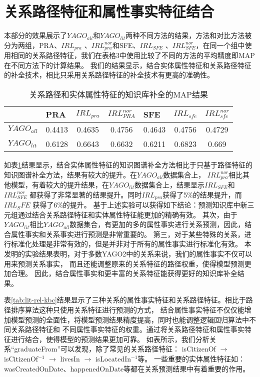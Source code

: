 \section{关系路径特征和属性事实特征结合}
\label{cha:exp-literal}
本部分的效果展示了$YAGO_{all}$和$YAGO_{lit}$两种不同方法的结果，方法和对比方法被分为两组，PRA、$IRL_{pra}$ 、$IRL_{pra}^{nor}$和SFE、$IRL_{SFE}$ 、$IRL_{SFE}^{nor}$，在同一个组中使用相同的关系路径特征，我们在表格3中使用比较了不同的方法的平均精度即MAP在不同方法下的计算结果。
我们的结果显示，结合实体属性特征和关系路径特征的补全技术，相比只采用关系路径特征的补全技术有更高的准确性。


\begin{table}[htbp]
  \centering
  \caption{关系路径和实体属性特征的知识库补全的MAP结果}
    \begin{tabular}{|l|c|c|c|c|c|c|}
    \hline
    \multicolumn{1}{|c|}{} & \multicolumn{1}{l|}{PRA} & \multicolumn{1}{l|}{$IRL_{pra}$} & \multicolumn{1}{l|}{$IRL_{PRA}^{nor}$} & \multicolumn{1}{l|}{SFE} & \multicolumn{1}{l|}{$IRL_{sfe}$} & \multicolumn{1}{l|}{$IRL_{sfe}^{nor}$} \\
    \hline
    $YAGO_{all}$ & 0.4413 & 0.4635 & 0.4756 & 0.4643 & 0.4756 & 0.4729 \\
    \hline
    $YAGO_{lit}$ & 0.6128 & 0.6643 & 0.6632 & 0.6211 & 0.6823 & 0.669 \\
    \hline
    \end{tabular}%
  \label{tab:addlabel}%
\end{table}%


如表\ref{tab:addlabel}结果显示，结合实体属性特征的知识图谱补全方法相比于只基于路径特征的知识图谱补全方法，结果有较大的提升。在$YAGO_{all}$数据集合上，
$IRL_{pra}^{nor}$相比其他模型，有着较大的提升结果，在$YAGO_{lit}$数据集合上，结果显示$IRL_{SFE}$和$IRL_{SFE}^{nor}$ 都获得了非常显著的结果提升。同时$IRL_{pra}$获得了5\%的结果提升，而$IRL_SFE$ 获得了6\%的提升。
基于上述实验可以获得如下结论：预测知识库中新三元组通过结合关系路径特征和实体属性特征能更加的精确有效。
其次，由于$YAGO_{lit}$相比$YAGO_{all}$数据集合，有更加的多的属性事实进行关系预测，因此，结合属性事实和关系事实进行预测是非常重要的。
第三，对于某些特殊的关系，进行标准化处理是非常有效的，但是并非对于所有的属性事实进行标准化有效。
本发明的实验结果表明，对于多数YAGO2中的关系来说，我们的属性事实不仅可以用来预测关系事实，
而且还能调整原来的关系特征的路径权重，使得模型预测更加合理。
因此，结合属性事实和更丰富的关系特征能获得更好的知识库补全结果。

表\ref{tab:lit-rel-kbc}结果显示了三种关系的属性事实特征和关系路径特征。相比于路径排序算法这种只使用关系特征进行预测的方式，
结合属性事实特征不仅仅能增加模型预测的全面性，将模型预测结果精度提高，同时也能调整逻辑回归算法中不同关系路径特征和
不同属性事实特征的权重。通过将关系路径特征和属性事实特征进行结合，使得模型的预测结果更加可靠。
如表所示，我们分析关系“graduateFrom”可以发现，除了常见的关系路径特征：
isCitizenOf $\to$ isCitizenOf$^{-1}$ $\to$ livesIn $\to$ isLocatedIn$^{-1}$等。
一些重要的实体属性特征如：wasCreatedOnDate、happenedOnDate等都在关系预测结果中有着重要的作用。

